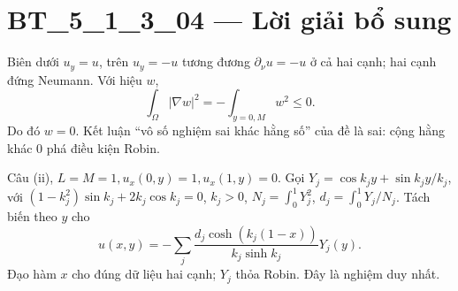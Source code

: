 \documentclass[10pt,a4paper]{article}
\begin{document}
\section*{BT\_5\_1\_3\_04 — Lời giải bổ sung}
Biên dưới $u_y=u$, trên $u_y=-u$ tương đương $\partial_\nu u=-u$ ở cả hai cạnh; hai cạnh đứng Neumann. Với hiệu $w$,
\[\int_\Omega|\nabla w|^2=-\int_{y=0,M}w^2\le0.\]
Do đó $w=0$. Kết luận ``vô số nghiệm sai khác hằng số'' của đề là sai: cộng hằng khác 0 phá điều kiện Robin.

Câu (ii), $L=M=1,u_x(0,y)=1,u_x(1,y)=0$. Gọi $Y_j=\cos k_jy+\sin k_jy/k_j$, với $(1-k_j^2)\sin k_j+2k_j\cos k_j=0$, $k_j>0$, $N_j=\int_0^1Y_j^2$, $d_j=\int_0^1Y_j/N_j$. Tách biến theo $y$ cho
\[u(x,y)=-\sum_j\frac{d_j\cosh(k_j(1-x))}{k_j\sinh k_j}Y_j(y).\]
Đạo hàm $x$ cho đúng dữ liệu hai cạnh; $Y_j$ thỏa Robin. Đây là nghiệm duy nhất.
\end{document}
